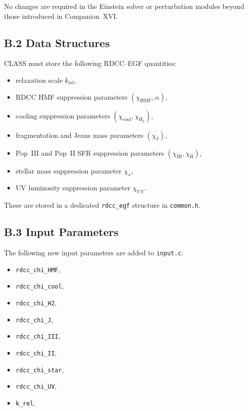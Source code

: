 \documentclass[11pt,a4paper]{article}
\begin{document}
No changes are required in the Einstein solver or perturbation modules beyond those introduced 
in Companion~XVI.

\subsection*{B.2 Data Structures}

CLASS must store the following RDCC–EGF quantities:

\begin{itemize}
    \item relaxation scale $k_{\mathrm{rel}}$,
    \item RDCC HMF suppression parameters $(\chi_{\mathrm{HMF}}, \alpha)$,
    \item cooling suppression parameters $(\chi_{\mathrm{cool}}, \chi_{\mathrm{H_2}})$,
    \item fragmentation and Jeans mass parameters $(\chi_{\mathrm{J}})$,
    \item Pop~III and Pop~II SFR suppression parameters $(\chi_{\mathrm{III}}, \chi_{\mathrm{II}})$,
    \item stellar mass suppression parameter $\chi_{\star}$,
    \item UV luminosity suppression parameter $\chi_{\mathrm{UV}}$.
\end{itemize}

These are stored in a dedicated \texttt{rdcc\_egf} structure in \texttt{common.h}.

\subsection*{B.3 Input Parameters}

The following new input parameters are added to \texttt{input.c}:

\begin{itemize}
    \item \texttt{rdcc\_chi\_HMF},
    \item \texttt{rdcc\_chi\_cool},
    \item \texttt{rdcc\_chi\_H2},
    \item \texttt{rdcc\_chi\_J},
    \item \texttt{rdcc\_chi\_III},
    \item \texttt{rdcc\_chi\_II},
    \item \texttt{rdcc\_chi\_star},
    \item \texttt{rdcc\_chi\_UV},
    \item \texttt{k\_rel}.
\end{itemize}
\end{document}
